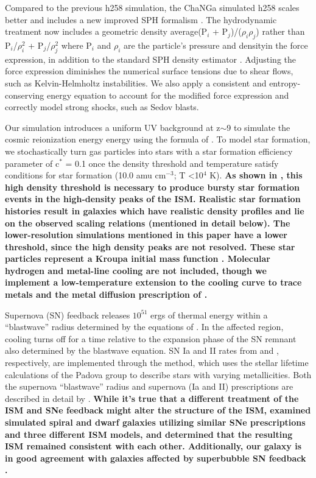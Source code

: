 \documentclass[]{emulateapj}
\begin{document}
Compared to the previous h258 simulation, the ChaNGa simulated h258 scales better and includes a new improved SPH formalism \citep{Keller2014}. The hydrodynamic treatment now includes a geometric density average\textemdash (P$_i$ + P$_j$)/($\rho_i \rho_j$) rather than P$_i$/$\rho_{i}^2$ + P$_j$/$\rho_{j}^2$ where P$_i$ and $\rho_i$ are the particle's pressure and density\textemdash in the force expression, in addition to the standard SPH density estimator \citep{Ritchie2001}. Adjusting the force expression diminishes the numerical surface tensions due to shear flows, such as Kelvin-Helmholtz instabilities. We also apply a consistent and entropy-conserving energy equation to account for the modified force expression and correctly model strong shocks, such as Sedov blasts.

Our simulation introduces a uniform UV background at z$\sim$9 to simulate the cosmic reionization energy energy using the formula of \cite{Haardt2012}. To model star formation, we stochastically turn gas particles into stars with a star formation efficiency parameter of c$^*$ = 0.1 once the density threshold and temperature satisfy conditions for star formation (10.0 amu cm$^{-3}$; T \textless 10$^4$ K). \textbf{As shown in \citet{Governato2009a}, this high density threshold is necessary to produce bursty star formation events in the high-density peaks of the ISM.  Realistic star formation histories result in galaxies which have realistic density profiles and lie on the observed scaling relations (mentioned in detail below).  The lower-resolution simulations mentioned in this paper have a lower threshold, since the high density peaks are not resolved. These star particles represent a Kroupa initial mass function \citep{Kroupa1993}.  Molecular hydrogen and metal-line cooling are not included, though we implement a low-temperature extension to the cooling curve to trace metals \citep{Bromm2001} and the metal diffusion prescription of \cite{Shen2010}. }

Supernova (SN) feedback releases $10^{51}$ ergs of thermal energy within a ``blastwave'' radius determined by the equations of \cite{Ostriker1988}. In the affected region, cooling turns off for a time relative to the expansion phase of the SN remnant also determined by the blastwave equation. SN Ia and II rates from \cite{Thielemann1986} and \cite{Woosley1995}, respectively, are implemented through the \cite{Raiteri1996} method, which uses the stellar lifetime calculations of the Padova group \citep{Alongi1993, Bressan1993, Bertelli1994} to describe stars with varying metallicities. Both the supernova ``blastwave'' radius and supernova (Ia and II) prescriptions are described in detail by \cite{Stinson2006}. \textbf{While it's true that a different treatment of the ISM and SNe feedback might alter the structure of the ISM, \cite{Christensen2014} examined simulated spiral and dwarf galaxies utilizing similar SNe prescriptions and three different ISM models, and determined that the resulting ISM remained consistent with each other. Additionally, our galaxy is in good agreement with galaxies affected by superbubble SN feedback \citep{Keller2014}.}
\end{document}
